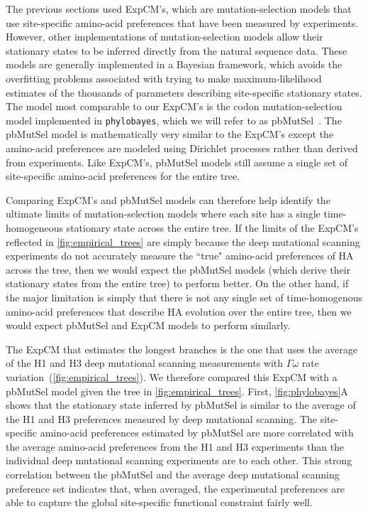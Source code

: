 \documentclass[11pt]{article}
\begin{document}
The previous sections used ExpCM's, which are mutation-selection models that use site-specific amino-acid preferences that have been measured by experiments. 
However, other implementations of mutation-selection models allow their stationary states to be inferred directly from the natural sequence data. 
These models are generally implemented in a Bayesian framework, which avoids the overfitting problems associated with trying to make maximum-likelihood estimates of the thousands of parameters describing site-specific stationary states.
The model most comparable to our ExpCM's is the codon mutation-selection model implemented in \texttt{phylobayes}, which we will refer to as pbMutSel~\citep{rodrigue2014site}. 
The pbMutSel model is mathematically very similar to the ExpCM's except the amino-acid preferences are modeled using Dirichlet processes rather than derived from experiments. 
Like ExpCM's, pbMutSel models still assume a single set of site-specific amino-acid preferences for the entire tree.

Comparing ExpCM's and pbMutSel models can therefore help identify the ultimate limits of mutation-selection models where each site has a single time-homogeneous stationary state across the entire tree. 
If the limits of the ExpCM's reflected in \ref{fig:empirical_trees} are simply because the deep mutational scanning experiments do not accurately measure the ``true" amino-acid preferences of HA across the tree, then we would expect the pbMutSel models (which derive their stationary states from the entire tree) to perform better.
On the other hand, if the major limitation is simply that there is not any single set of time-homogenous amino-acid preferences that describe HA evolution over the entire tree, then we would expect pbMutSel and ExpCM models to perform similarly.

The ExpCM that estimates the longest branches is the one that uses the average of the H1 and H3 deep mutational scanning measurements with $\Gamma\omega$ rate variation~(\ref{fig:empirical_trees}).  
We therefore compared this ExpCM with a pbMutSel model given the tree in \ref{fig:empirical_trees}. 
First, \ref{fig:phylobayes}A shows that the stationary state inferred by pbMutSel is similar to the average of the H1 and H3 preferences measured by deep mutational scanning. 
The site-specific amino-acid preferences estimated by pbMutSel are more correlated with the average amino-acid preferences from the H1 and H3 experiments than the individual deep mutational scanning experiments are to each other. 
This strong correlation between the pbMutSel and the average deep mutational scanning preference set indicates that, when averaged, the experimental preferences are able to capture the global site-specific functional constraint fairly well. 
\end{document}
